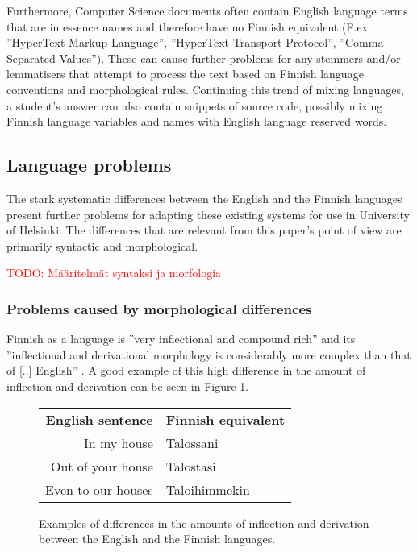 \documentclass[english]{tktltiki2}
\theoremstyle{definition}
\theoremstyle{remark}
\newcommand\todo[1]{\textcolor{red}{TODO: #1}}
\begin{document}
Furthermore, Computer Science documents often contain English language terms that are in essence names and therefore have no Finnish equivalent (F.ex. ''HyperText Markup Language'', ''HyperText Transport Protocol'', ''Comma Separated Values''). These can cause further problems for any stemmers and/or lemmatisers that attempt to process the text based on Finnish language conventions and morphological rules. Continuing this trend of mixing languages, a student's answer can also contain snippets of source code, possibly mixing Finnish language variables and names with English language reserved words.

\subsection{Language problems}
\label{sec:eng-vs-fin}

The stark systematic differences between the English and the Finnish languages present further problems for adapting these existing systems for use in University of Helsinki. The differences that are relevant from this paper's point of view are primarily syntactic and morphological. 

\todo{Määritelmät syntaksi ja morfologia}

\subsubsection{Problems caused by morphological differences}

Finnish as a language is ''very inflectional and compound rich'' and its ''inflectional and derivational morphology is considerably more complex than that of [..] English'' \cite{korenius04}. A good example of this high difference in the amount of inflection and derivation can be seen in Figure \ref{fig:eng-vs-fin-inflection}.

\begin{figure}[h]

	\centering

	\begin{tabular}{r|l}
		\textbf{English sentence}
		& \textbf{Finnish equivalent}
		\\
		In my house
		& Talossani
		\\		
		Out of your house
		& Talostasi
		\\
		Even to our houses
		& Taloihimmekin
	
	\end{tabular}

	\caption{Examples of differences in the amounts of inflection and derivation between the English and the Finnish languages.}
	\label{fig:eng-vs-fin-inflection}
\end{figure}
\end{document}
